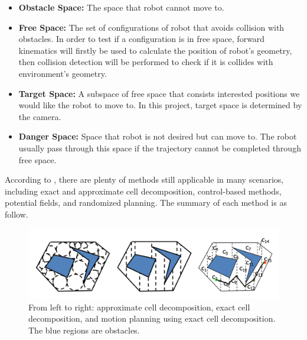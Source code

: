 \begin{itemize}
    \item \textbf{Obstacle Space:} The space that robot cannot move to. 
    \item \textbf{Free Space:} The set of configurations of robot that avoids collision with obstacles. In order to test if a configuration is in free space, forward kinematics will firstly be used to calculate the position of robot's geometry, then collision detection will be performed to check if it is collides with environment's geometry.
    \item \textbf{Target Space:} A subspace of free space that consists interested positions we would like the robot to move to. In this project, target space is determined by the camera.
    \item \textbf{Danger Space:} Space that robot is not desired but can move to. The robot usually pass through this space if the trajectory cannot be completed through free space.
\end{itemize}

According to \citep{OMPLPrim20:online}, there are plenty of methods still applicable in many scenarios, including exact and approximate cell decomposition, control-based methods, potential fields, and randomized planning. The summary of each method is as follow.

\begin{figure}[H]
\centering
\includegraphics[width = \columnwidth]{background/cell.png}
\caption{From left to right: approximate cell decomposition, exact cell decomposition, and motion planning using exact cell decomposition. The blue regions are obstacles. \citep{celldecom}}
\label{cell}
\end{figure}


